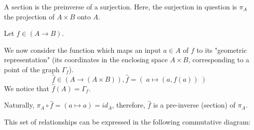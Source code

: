 A section is the preinverse of a surjection. Here, the surjection in question is $\pi_A$ the projection of $A \times B$ onto $A$.

Let $f \in (A \to B)$.


We now consider the function which maps an input $a \in A$ of $f$ to its "geometric representation" (its coordinates in the enclosing space $A \times B$, corresponding to a point of the graph $\Gamma_f$). 
$$\hat{f} \in (A \to (A \times B)), \hat{f} = ( \; a \mapsto (a, f(a)) \; )$$
We notice that $\hat{f}(A) = \Gamma_f$.

Naturally, $\pi_A \circ \hat{f} = (a \mapsto a) = id_A$, therefore, $\hat{f}$ is a pre-inverse (section) of $\pi_A$.

This set of relationships can be expressed in the following commutative diagram:

